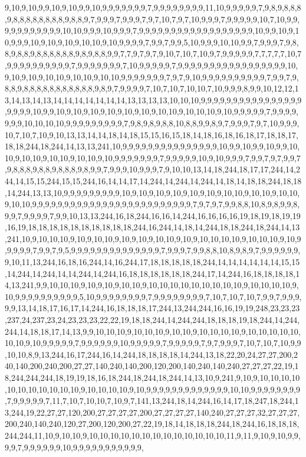 9,10,9,10,9,9,10,9,10,9,9,10,9,9,9,9,9,9,9,7,9,9,9,9,9,9,9,9,11,10,9,9,9,9,9,7,9,8,9,8,8,8,9,8,8,8,8,8,8,8,8,9,8,8,9,7,9,9,9,7,9,9,9,7,9,7,10,7,9,7,10,9,9,9,7,9,9,9,9,9,10,7,10,9,9,9,9,9,9,9,9,9,9,9,10,10,9,9,9,10,9,9,9,7,9,9,9,9,9,9,9,9,9,9,9,9,9,9,9,9,9,9,10,9,9,10,9,10,9,9,9,10,9,10,9,10,9,10,10,9,10,9,9,9,9,7,9,9,7,9,9,5,10,9,9,9,10,10,9,9,7,9,9,9,7,9,8,8,9,8,8,9,8,8,8,8,8,8,9,8,9,8,8,9,9,7,7,9,7,9,7,9,10,7,10,7,10,9,7,9,9,9,9,9,7,7,7,7,7,10,7,9,9,9,9,9,9,9,9,9,9,7,9,9,9,9,9,9,9,7,10,9,9,9,9,9,7,9,9,9,9,9,9,9,9,9,9,9,9,9,9,9,9,9,10,9,10,9,10,9,10,10,9,10,10,9,10,10,9,9,9,9,9,9,9,7,9,7,9,10,9,9,9,9,9,9,9,9,9,9,7,9,9,7,9,8,8,9,8,8,8,8,8,8,8,8,8,8,8,9,8,9,7,9,9,9,9,7,10,7,10,7,10,10,7,10,9,9,9,8,9,9,10,12,12,13,14,13,14,13,14,14,14,14,14,14,14,13,13,13,13,10,10,10,9,9,9,9,9,9,9,9,9,9,9,9,9,9,9,9,9,9,9,9,10,9,9,10,9,10,9,10,9,10,9,10,9,10,9,10,10,9,10,10,10,9,10,9,9,9,9,9,7,9,9,9,9,9,9,9,10,10,10,10,9,9,9,9,9,9,9,9,9,7,9,8,9,8,9,8,8,10,8,8,9,9,8,9,7,9,9,9,7,9,7,10,9,9,9,10,7,10,7,10,9,10,13,13,14,14,18,14,18,15,15,16,15,18,14,18,16,18,16,18,17,18,18,17,18,18,244,18,244,14,13,13,241,10,9,9,9,9,9,9,9,9,9,9,9,9,9,9,9,10,9,9,10,9,9,10,9,9,10,10,9,10,10,9,10,10,9,10,10,9,10,9,9,9,9,9,9,9,7,9,9,9,9,9,10,9,10,9,9,9,7,9,9,7,9,7,9,9,7,9,8,8,8,9,8,8,9,8,8,8,9,8,9,9,7,9,9,9,10,9,9,9,7,9,10,10,13,14,18,244,18,17,17,244,14,244,14,15,15,244,15,15,244,16,14,14,17,14,244,14,244,14,244,14,18,14,18,18,244,18,18,14,244,13,13,10,9,9,9,9,9,9,9,9,9,10,9,10,9,10,9,10,9,10,9,10,9,10,10,9,10,10,9,10,10,9,10,10,9,9,9,9,9,9,9,9,9,9,9,9,9,9,9,9,9,9,9,9,9,9,9,9,9,7,9,7,9,7,9,9,8,8,10,8,9,8,9,9,8,9,9,7,9,9,9,9,7,9,9,10,13,13,244,16,18,244,16,16,14,244,16,16,16,16,19,18,19,18,19,19,16,19,18,18,18,18,18,18,18,18,18,18,244,16,244,14,18,14,244,18,18,244,18,244,14,13,241,10,9,10,10,10,9,10,9,10,10,9,10,9,10,9,10,10,9,10,9,10,10,10,10,9,10,10,10,9,10,9,9,9,9,9,7,9,9,7,9,5,9,9,9,9,9,9,9,9,9,9,9,9,9,9,7,9,9,9,7,9,9,8,8,10,8,9,8,9,7,9,9,9,9,9,9,9,10,11,13,244,16,18,16,244,14,16,244,17,18,18,18,18,18,244,14,14,14,14,14,14,15,15,14,244,14,244,14,14,244,14,244,16,18,18,18,18,18,18,244,17,14,244,16,18,18,18,18,14,13,241,9,9,10,10,10,9,10,9,10,9,10,10,9,10,10,10,10,10,10,10,10,10,9,10,10,10,10,9,10,9,9,9,9,9,9,9,9,9,9,5,10,9,9,9,9,9,9,9,9,7,9,9,9,9,9,9,9,9,7,10,7,10,7,10,7,9,9,7,9,9,9,9,9,13,14,18,17,16,17,14,244,16,18,18,18,17,244,13,244,244,16,16,19,19,248,23,23,23,237,24,237,23,24,23,23,23,22,22,19,18,18,244,14,244,244,18,18,18,19,18,244,14,244,244,14,18,18,17,14,13,9,9,10,10,10,9,10,10,10,9,10,10,9,10,10,10,10,9,10,10,10,10,10,10,10,9,10,9,9,9,9,9,7,9,9,9,9,9,9,10,9,9,9,9,9,7,9,9,9,9,9,7,9,7,9,9,9,7,10,7,10,7,10,9,9,10,10,8,9,13,244,16,17,244,16,14,244,18,18,18,18,14,244,13,18,22,20,24,27,27,200,240,140,200,240,200,27,27,140,240,140,200,120,200,140,240,140,240,27,27,27,22,19,18,244,244,244,18,19,19,18,16,18,244,18,244,18,244,14,13,10,9,241,9,10,9,10,10,10,10,10,10,10,10,10,10,10,9,10,10,10,10,9,10,9,9,9,9,9,9,9,9,9,9,9,9,9,10,10,9,9,9,9,9,9,9,9,7,9,9,9,9,9,7,11,7,10,7,10,10,7,10,9,7,141,13,244,18,14,244,16,14,17,18,247,18,244,13,244,19,22,27,27,120,200,27,27,27,27,200,27,27,27,27,140,240,27,27,27,32,27,27,27,200,240,140,240,120,27,200,120,200,27,22,19,18,14,18,18,18,244,18,244,16,18,18,18,244,244,11,10,9,10,10,9,10,10,10,10,10,10,10,10,10,10,10,10,10,11,9,11,9,10,9,10,9,9,9,9,7,9,9,9,9,9,9,10,9,9,9,9,9,9,9,9,9,9,9,